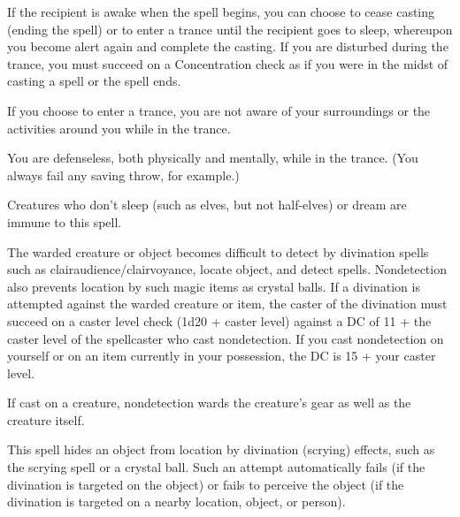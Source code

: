 \begin{multicols}{2}
\begin{small}
\smallskip\noindent If the recipient is awake when the spell begins, you can choose to cease casting (ending the spell) or to enter a trance until the recipient goes to sleep, whereupon you become alert again and complete the casting. If you are disturbed during the trance, you must succeed on a Concentration check as if you were in the midst of casting a spell or the spell ends.

\smallskip\noindent If you choose to enter a trance, you are not aware of your surroundings or the activities around you while in the trance.

\smallskip\noindent You are defenseless, both physically and mentally, while in the trance. (You always fail any saving throw, for example.)

\smallskip\noindent Creatures who don't sleep (such as elves, but not half-elves) or dream are immune to this spell.

\noindent The warded creature or object becomes difficult to detect by divination spells such as clairaudience/clairvoyance, locate object, and detect spells. Nondetection also prevents location by such magic items as crystal balls. If a divination is attempted against the warded creature or item, the caster of the divination must succeed on a caster level check (1d20 + caster level) against a DC of 11 + the caster level of the spellcaster who cast nondetection. If you cast nondetection on yourself or on an item currently in your possession, the DC is 15 + your caster level.

\smallskip\noindent If cast on a creature, nondetection wards the creature's gear as well as the creature itself.


\noindent This spell hides an object from location by divination (scrying) effects, such as the scrying spell or a crystal ball. Such an attempt automatically fails (if the divination is targeted on the object) or fails to perceive the object (if the divination is targeted on a nearby location, object, or person).


\end{small}
\end{multicols}

